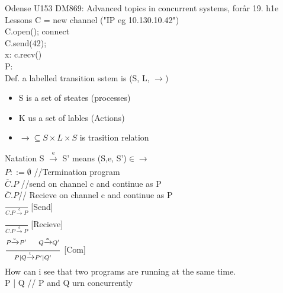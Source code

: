 \documentclass[a4paper,10pt,titlepage]{report}
\begin{document}
 Odense U153
DM869: Advanced topics in concurrent systems, forår 19. h1e  
Lessons
C = new channel ("IP eg 10.130.10.42")\\

C.open(); connect\\
C.send(42);\\

x: c.recv()\\
P:\\


Def. a labelled transition sstem is (S, L, $\rightarrow$)\\
\begin{itemize}
\item S is a set of steates (processes)
\item K us a set of lables (Actions)
\item $\rightarrow \subseteq S\times L\times S $ is trasition relation 
\end{itemize}

Natation S $ \xrightarrow[\text{}]{\text{e}} $ S' means (S,e, S')$ \in \rightarrow$ \\


$P::= \emptyset$ \hspace{20mm}//Termination program\\

$\overline{C}.P$ \hspace{24mm}//send on channel c and continue as P \\

$\overline{C}.P $\hspace{25mm}// Recieve on channel c and continue as P \\


$ \frac{}{C.P \xrightarrow[\text{}]{\text{c}}P}  $ [Send]\\

$ \frac{}{ \overline{C}.P \xrightarrow[\text{}]{\overline{ \text{c} }}P}  $ [Recieve]\\

$ \frac{P \xrightarrow[\text{}]{{ \text{c} }}P' \hspace{5mm} Q\xrightarrow[\text{}]{{ \text{a} }}Q'}{P|Q \xrightarrow[\text{}]{{ \text{t} }}P'| Q'}  $ [Com]\\




How can i see that two programs are running at the same time.\\

P | Q \hspace{21mm}// P and Q urn concurrently\\
\end{document}
